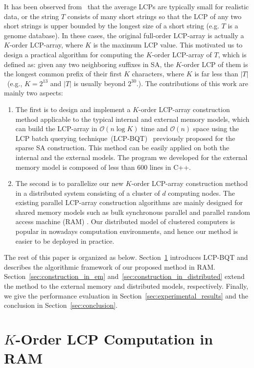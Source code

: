 \documentclass[10pt,journal,compsoc]{IEEEtran}
\begin{document}
\begin{CJK*}{GBK}{song}
It has been observed from~\cite{Felipe2013} that the average LCPs are typically small for realistic data, or the string $T$ consists of many short strings so that the LCP of any two short strings is upper bounded by the longest size of a short string (e.g. $T$ is a genome database). In these cases, the original full-order LCP-array is actually a $K$-order LCP-array, where $K$ is the maximum LCP value.
This motivated us to design a practical algorithm for computing the $K$-order LCP-array of $T$, which is defined as: given any two neighboring suffixes in SA, the $K$-order LCP of them is the longest common prefix of their first $K$ characters, where $K$ is far less than $|T|$~(e.g., $K=2 ^{13}$ and $|T|$ is usually beyond $2^{30}$.). The contributions of this work are mainly two aspects:
\begin{enumerate}
\item The first is to design and implement a $K$-order LCP-array construction method applicable to the typical internal and external memory models, which can build the LCP-array in $\mathcal{O}(n\log K)$ time and $\mathcal{O}(n)$ space using the LCP batch querying technique~(LCP-BQT)~\cite{Philip2013} previously proposed for the sparse SA construction. This method can be easily applied on both the internal and the external models. The program we developed for the external memory model is composed of less than 600 lines in C++.
\item The second is to parallelize our new $K$-order LCP-array construction method in a distributed system consisting of a cluster of $d$ computing nodes. The existing parallel LCP-array construction algorithms are mainly designed for shared memory models such as bulk synchronous parallel and parallel random access machine (RAM) \cite{Shun2014,Deo2013}. Our distributed model of clustered computers is popular in nowadays computation environments, and hence our method is easier to be deployed in practice.
\end{enumerate}

The rest of this paper is organized as below. Section~\ref{sec:construction_in_ram} introduces LCP-BQT and describes the algorithmic framework of our proposed method in RAM. Section~\ref{sec:construction_in_em} and~\ref{sec:construction_in_distributed} extend the method to the external memory and distributed models, respectively. Finally, we give the performance evaluation in Section~\ref{sec:experimental_results} and the conclusion in Section~\ref{sec:conclusion}.

\section{$K$-Order LCP Computation in RAM}\label{sec:construction_in_ram}


\end{CJK*}
\end{document}
